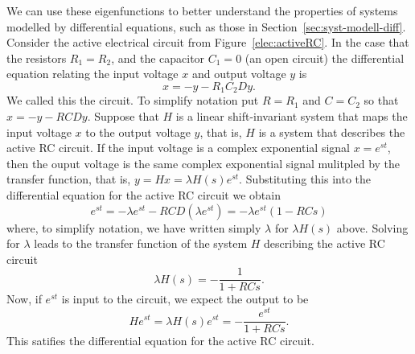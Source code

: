 We can use these eigenfunctions to better understand the properties of systems modelled by differential equations, such as those in Section~\ref{sec:syst-modell-diff}.  Consider the active electrical circuit from Figure~\ref{elec:activeRC}.  In the case that the resistors $R_1 = R_2$, and the capacitor $C_1 = 0$ (an open circuit) the differential equation relating the input voltage $x$ and output voltage $y$ is
\[
x = - y - R_1 C_2 Dy.
\]
We called this the  circuit.  To simplify notation put $R = R_1$ and $C = C_2$ so that $x = -y - RCD y$.   
Suppose that $H$ is a linear shift-invariant system that maps the input voltage $x$ to the output voltage $y$, that is, $H$ is a system that describes the active RC circuit.  If the input voltage is a complex exponential signal $x = e^{st}$, then the ouput voltage is the same complex exponential signal mulitpled by the transfer function, that is, $y = Hx = \lambda H(s) e^{st}$.  Substituting this into the differential equation for the active RC circuit we obtain
\[
e^{st} = - \lambda e^{st}- R C D (\lambda e^{st}) = -\lambda e^{st} (1  - R C s)
\]
where, to simplify notation, we have written simply $\lambda$ for $\lambda H(s)$ above.  Solving for $\lambda$ leads to the transfer function of the system $H$ describing the active RC circuit
\begin{equation}\label{eq:transferRCH}
\lambda H(s) = -\frac{1}{1 + R C s}.
\end{equation}
Now, if $e^{st}$ is input to the circuit, we expect the output to be
\[
H e^{st} = \lambda H(s) e^{st} = -\frac{e^{st}}{1 + R C s}.
\]
This satifies the differential equation for the active RC circuit.

